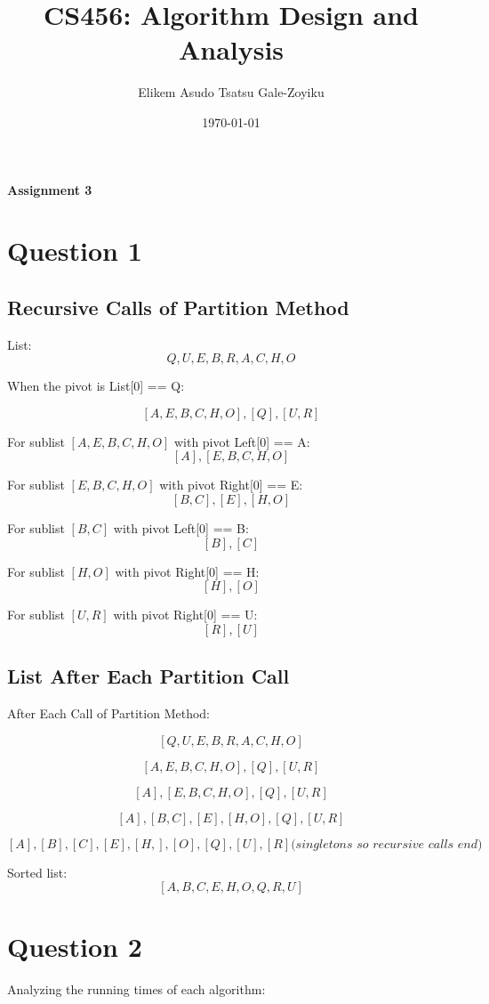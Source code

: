 \documentclass{article}
\title{\textbf{CS456: Algorithm Design and Analysis}}
\author{Elikem Asudo Tsatsu Gale-Zoyiku}
\date{\today}
\begin{document}
\maketitle
\begin{center}
    \begin{large}
        \textbf{Assignment 3\\}
    \end{large}
\end{center}
\newpage
\section*{Question 1}
\subsection*{Recursive Calls of Partition Method}
List: \[Q, U, E, B, R, A, C, H, O\]

When the pivot is List[0] == Q:

\[ [A, E, B, C, H, O], [Q], [U, R] \]

For sublist \([A, E, B, C, H, O]\) with pivot Left[0] == A:
\[ [A], [E, B, C, H, O] \]

For sublist \([E, B, C, H, O]\) with pivot Right[0] == E:
\[ [B, C], [E], [H, O] \]

For sublist \([B, C]\) with pivot Left[0] == B: \[ [B], [C] \]

For sublist \([H, O]\) with pivot Right[0] == H: \[ [H], [O] \]

For sublist \([U, R]\) with pivot Right[0] == U: \[ [R], [U] \]

\subsection*{List After Each Partition Call}
After Each Call of Partition Method:

\[
    [Q, U, E, B, R, A, C, H, O]
\]

\[
    [A, E, B, C, H, O], [Q], [U, R]
\]

\[
    [A], [E, B, C, H, O], [Q], [U, R]
\]

\[
    [A], [B, C], [E], [H, O], [Q], [U, R]
\]

\[
    [A], [B], [C], [E], [H,], [O], [Q], [U], [R]
    \textit{(singletons so recursive calls end)}\]

Sorted list: \[ [A, B, C, E, H, O, Q, R, U] \]
\newpage
\section*{Question 2}
Analyzing the running times of each algorithm:
\end{document}
